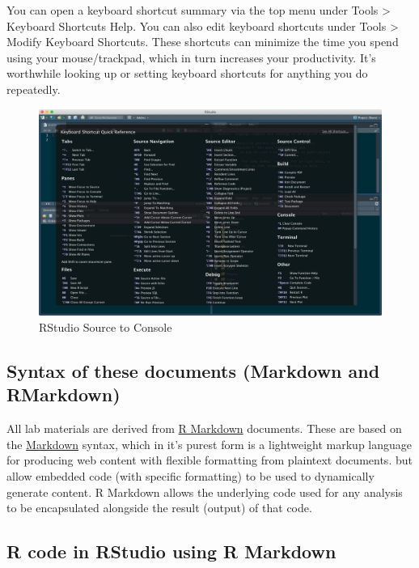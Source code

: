 \documentclass[
]{article}
\begin{document}
You can open a keyboard shortcut summary via the top menu under Tools
\textgreater{} Keyboard Shortcuts Help. You can also edit keyboard
shortcuts under Tools \textgreater{} Modify Keyboard Shortcuts. These
shortcuts can minimize the time you spend using your mouse/trackpad,
which in turn increases your productivity. It's worthwhile looking up or
setting keyboard shortcuts for anything you do repeatedly.

\begin{figure}
\centering
\includegraphics{screenshots/shortcuts.png}
\caption{RStudio Source to Console}
\end{figure}

\hypertarget{syntax-of-these-documents-markdown-and-rmarkdown}{%
\subsection{Syntax of these documents (Markdown and
RMarkdown)}\label{syntax-of-these-documents-markdown-and-rmarkdown}}

All lab materials are derived from
\href{https://rmarkdown.rstudio.com/lesson-1.html}{R Markdown}
documents. These are based on the
\href{https://www.markdownguide.org/getting-started/}{Markdown} syntax,
which in it's purest form is a lightweight markup language for producing
web content with flexible formatting from plaintext documents. but allow
embedded code (with specific formatting) to be used to dynamically
generate content. R Markdown allows the underlying code used for any
analysis to be encapsulated alongside the result (output) of that code.

\hypertarget{r-code-in-rstudio-using-r-markdown}{%
\subsection{R code in RStudio using R
Markdown}\label{r-code-in-rstudio-using-r-markdown}}
\end{document}
